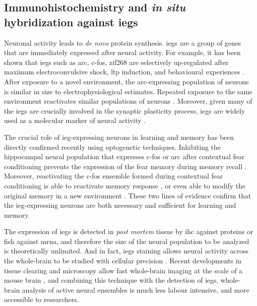 \subsection{Immunohistochemistry and \textit{in situ} hybridization against \glspl{ieg}}
Neuronal activity leads to \textit{de novo} protein synthesis. \Glspl{ieg} are a group of genes that are immediately expressed after neural activity. For example, it has been shown that \glspl{ieg} such as \gls{arc}, c-fos, zif268 are selectively up-regulated after maximum electroconvulsive shock, \gls{ltp} induction, and behavioural experiences \citep{guzowski99, vann00, hall01}. After exposure to a novel environment, the \gls{arc}-expressing population of neurons is similar in size to electrophysiological estimates. Repeated exposure to the same environment reactivates similar populations of neurons \citep{guzowski06, niibori12}. Moreover, given many of the \glspl{ieg} are crucially involved in the synaptic plasticity process, \glspl{ieg} are widely used as a molecular marker of neural activity \citep{minatohara15}. 

The crucial role of \gls{ieg}-expressing neurons in learning and memory has been directly confirmed recently using optogenetic techniques. Inhibiting the hippocampal neural population that expresses c-fos or \gls{arc} after contextual fear conditioning prevents the expression of the fear memory during memory recall \citep{denny14, tanaka14}. Moreover, reactivating the c-fos ensemble formed during contextual fear conditioning is able to reactivate memory response \citep{liu12, cowansage14, ohkawa15}, or even able to modify the original memory in a new environment \citep{ramirez13, redondo14}. These two lines of evidence confirm that the \gls{ieg}-expressing neurons are both necessary and sufficient for learning and memory. 

The expression of \glspl{ieg} is detected in \textit{post mortem} tissue by \gls{ihc} against proteins or \gls{fish} against \gls{mrna}, and therefore the size of the neural population to be analyzed is theoretically unlimited. And in fact, \glspl{ieg} staining allows neural activity across the whole-brain to be studied with cellular precision \citep{wheeler13}. Recent developments in tissue clearing and microscopy allow fast whole-brain imaging at the scale of a mouse brain \citep{chung13, tomer14}, and combining this technique with the detection of \glspl{ieg}, whole-brain analysis of active neural ensembles is much less labour intensive, and more accessible to researchers.   

